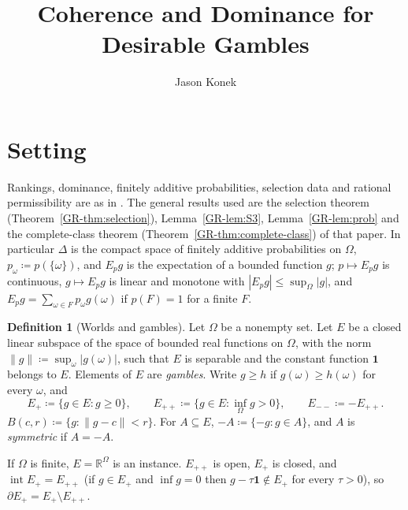 \documentclass[11pt]{article}
\title{Coherence and Dominance for Desirable Gambles}
\author{Jason Konek}
\date{}
\theoremstyle{definition}
\newtheorem{definition}[theorem]{Definition}
\theoremstyle{remark}
\newcommand{\one}{\mathbf 1}
\newcommand{\R}{\mathbb R}
\newcommand{\interior}{\operatorname{int}}
\newcommand{\bd}{\partial}
\begin{document}
\maketitle


\section{Setting}\label{sec:setting}

Rankings, dominance, finitely additive probabilities, selection data and rational permissibility are as in \cite{KonekGR}. The general results used are the selection theorem (Theorem~\ref{GR-thm:selection}), Lemma~\ref{GR-lem:S3}, Lemma~\ref{GR-lem:prob} and the complete-class theorem (Theorem~\ref{GR-thm:complete-class}) of that paper. In particular $\Delta$ is the compact space of finitely additive probabilities on $\Omega$, $p_\omega\coloneqq p(\{\omega\})$, and $E_pg$ is the expectation of a bounded function $g$; $p\mapsto E_pg$ is continuous, $g\mapsto E_pg$ is linear and monotone with $|E_pg|\le\sup_\Omega|g|$, and $E_pg=\sum_{\omega\in F}p_\omega g(\omega)$ if $p(F)=1$ for a finite $F$.

\begin{definition}[Worlds and gambles]\label{def:gambles}
Let $\Omega$ be a nonempty set. Let $E$ be a closed linear subspace of the space of bounded real functions on $\Omega$, with the norm $\|g\|\coloneqq\sup_{\omega}|g(\omega)|$, such that $E$ is separable and the constant function $\one$ belongs to $E$. Elements of $E$ are \emph{gambles}. Write $g\ge h$ if $g(\omega)\ge h(\omega)$ for every $\omega$, and
\[
E_+\coloneqq\{g\in E:g\ge0\},\qquad E_{++}\coloneqq\{g\in E:\inf_\Omega g>0\},\qquad E_{--}\coloneqq-E_{++}.
\]
$B(c,r)\coloneqq\{g:\|g-c\|<r\}$. For $A\subseteq E$, $-A\coloneqq\{-g:g\in A\}$, and $A$ is \emph{symmetric} if $A=-A$.
\end{definition}

If $\Omega$ is finite, $E=\R^\Omega$ is an instance. $E_{++}$ is open, $E_+$ is closed, and $\interior E_+=E_{++}$ (if $g\in E_+$ and $\inf g=0$ then $g-\tau\one\notin E_+$ for every $\tau>0$), so $\bd E_+=E_+\setminus E_{++}$.
\end{document}
